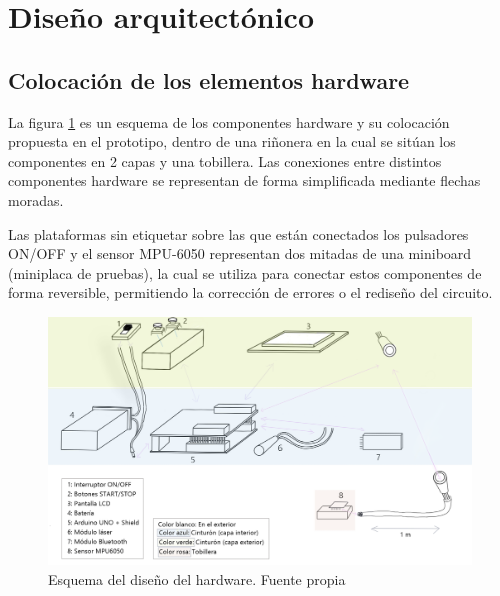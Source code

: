 
\section{Diseño arquitectónico}
\subsection{Colocación de los elementos hardware}
La figura \ref{fig:esquemahardware} es un esquema de los componentes hardware y su colocación propuesta en el prototipo, dentro de una riñonera en la cual se sitúan los componentes en 2 capas y una tobillera. Las conexiones entre distintos componentes hardware se representan de forma simplificada mediante flechas moradas. 

Las plataformas sin etiquetar sobre las que están conectados los pulsadores ON/OFF y el sensor MPU-6050 representan dos mitadas de una miniboard (miniplaca de pruebas), la cual se utiliza para conectar estos componentes de forma reversible, permitiendo la corrección de errores o el rediseño del circuito.
\begin{figure}[h]
    \centering
    \includegraphics[width=1\textwidth]{img/esquemahardware.png}
    \caption{Esquema del diseño del hardware. Fuente propia}
    \label{fig:esquemahardware}
\end{figure}
